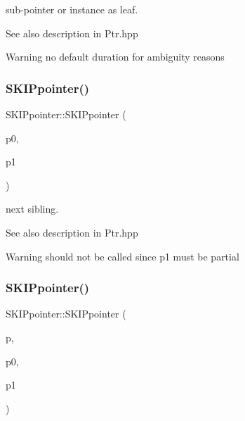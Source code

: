 sub-\/pointer or instance as leaf. 

\begin{DoxySeeAlso}{See also}
description in Ptr.\+hpp 
\end{DoxySeeAlso}
\begin{DoxyWarning}{Warning}
no default duration for ambiguity reasons 
\end{DoxyWarning}
\mbox{\label{group__table_ga5dd0fd6fd23ca132973ec5f76a7f568d}} 
\subsubsection{\texorpdfstring{SKIPpointer()}{SKIPpointer()}\hspace{0.1cm}{\footnotesize\ttfamily [6/7]}}
{\footnotesize\ttfamily S\+K\+I\+Ppointer\+::\+S\+K\+I\+Ppointer (\begin{DoxyParamCaption}\item[{const \mbox{\hyperlink{classSKIPpointer}{S\+K\+I\+Ppointer}} \&}]{p0,  }\item[{const \mbox{\hyperlink{classSKIPpointer}{S\+K\+I\+Ppointer}} \&}]{p1 }\end{DoxyParamCaption})}



next sibling. 

\begin{DoxySeeAlso}{See also}
description in Ptr.\+hpp 
\end{DoxySeeAlso}
\begin{DoxyWarning}{Warning}
should not be called since p1 must be partial 
\end{DoxyWarning}
\mbox{\label{group__table_ga8b87b18aa76b4021da6d3421c738b002}} 
\subsubsection{\texorpdfstring{SKIPpointer()}{SKIPpointer()}\hspace{0.1cm}{\footnotesize\ttfamily [7/7]}}
{\footnotesize\ttfamily S\+K\+I\+Ppointer\+::\+S\+K\+I\+Ppointer (\begin{DoxyParamCaption}\item[{const \mbox{\hyperlink{classSKIPpointer}{S\+K\+I\+Ppointer}} \&}]{p,  }\item[{const \mbox{\hyperlink{classSKIPpointer}{S\+K\+I\+Ppointer}} \&}]{p0,  }\item[{const \mbox{\hyperlink{classSKIPpointer}{S\+K\+I\+Ppointer}} \&}]{p1 }\end{DoxyParamCaption})}



